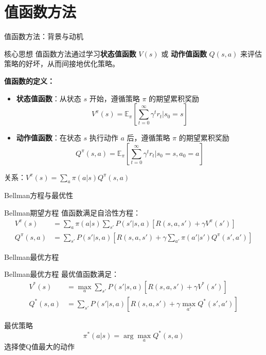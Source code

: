 \documentclass{beamer}
\begin{document}
\section{值函数方法}

\begin{frame}{值函数方法：背景与动机}
    \begin{block}{核心思想}
        值函数方法通过学习\textbf{状态值函数} $V(s)$ 或 \textbf{动作值函数} $Q(s,a)$ 来评估策略的好坏，从而间接地优化策略。
    \end{block}
    
    \vspace{0.3cm}
    
    \textbf{值函数的定义：}
    \begin{itemize}
        \item \textbf{状态值函数}：从状态 $s$ 开始，遵循策略 $\pi$ 的期望累积奖励
        \[ V^\pi(s) = \mathbb{E}_\pi \left[ \sum_{t=0}^{\infty} \gamma^t r_t \Big| s_0 = s \right] \]
        \item \textbf{动作值函数}：在状态 $s$ 执行动作 $a$ 后，遵循策略 $\pi$ 的期望累积奖励
        \[ Q^\pi(s,a) = \mathbb{E}_\pi \left[ \sum_{t=0}^{\infty} \gamma^t r_t \Big| s_0 = s, a_0 = a \right] \]
    \end{itemize}
    
    \vspace{0.2cm}
    {\small 关系：$V^\pi(s) = \sum_a \pi(a|s) Q^\pi(s,a)$}
\end{frame}

\begin{frame}{Bellman方程与最优性}
    \begin{block}{Bellman期望方程}
        值函数满足自洽性方程：
        \begin{align*}
        V^\pi(s) &= \sum_a \pi(a|s) \sum_{s'} P(s'|s,a) \left[ R(s,a,s') + \gamma V^\pi(s') \right] \\
        Q^\pi(s,a) &= \sum_{s'} P(s'|s,a) \left[ R(s,a,s') + \gamma \sum_{a'} \pi(a'|s') Q^\pi(s',a') \right]
        \end{align*}
    \end{block}
\end{frame}

\begin{frame}{Bellman最优方程}
    \begin{block}{Bellman最优方程}
        最优值函数满足：
        \begin{align*}
        V^*(s) &= \max_a \sum_{s'} P(s'|s,a) \left[ R(s,a,s') + \gamma V^*(s') \right] \\
        Q^*(s,a) &= \sum_{s'} P(s'|s,a) \left[ R(s,a,s') + \gamma \max_{a'} Q^*(s',a') \right]
        \end{align*}
    \end{block}
    
    \vspace{0.3cm}
    
    \begin{block}{最优策略}
        \[
        \pi^*(a|s) = \arg\max_a Q^*(s,a)
        \]
        选择使Q值最大的动作
    \end{block}
\end{frame}
\end{document}
